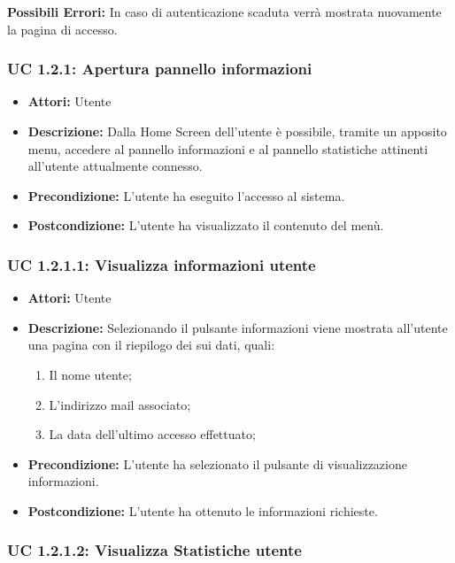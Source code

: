 	\textbf{Possibili Errori:}
In caso di autenticazione scaduta verrà mostrata nuovamente la pagina di accesso.

\subsubsection{UC 1.2.1: Apertura pannello informazioni}

\begin{itemize}
    \item \textbf{Attori:} Utente
    \item \textbf{Descrizione:} Dalla Home Screen dell'utente è possibile, tramite un apposito menu, accedere al pannello informazioni e al pannello statistiche attinenti all'utente attualmente connesso.
    \item \textbf{Precondizione:} L'utente ha eseguito l'accesso al sistema.
    \item \textbf{Postcondizione:} L'utente ha visualizzato il contenuto del menù.
\end{itemize}

\subsubsection{UC 1.2.1.1: Visualizza informazioni utente}

\begin{itemize}
    \item \textbf{Attori:} Utente
    \item \textbf{Descrizione:} Selezionando il pulsante informazioni viene mostrata all'utente una pagina con il riepilogo dei sui dati, quali:
    \begin{enumerate}
        \item Il nome utente;
        \item L'indirizzo mail associato;
        \item La data dell'ultimo accesso effettuato;
    \end{enumerate}
    \item \textbf{Precondizione:} L'utente ha selezionato il pulsante di visualizzazione informazioni.
    \item \textbf{Postcondizione:} L'utente ha ottenuto le informazioni richieste.
\end{itemize}

\subsubsection{UC 1.2.1.2: Visualizza Statistiche utente}

